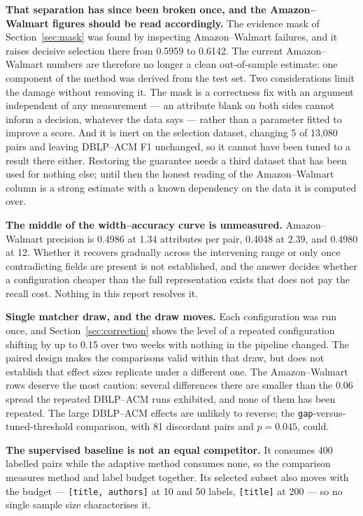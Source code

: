 \documentclass[11pt]{article}
\begin{document}
\textbf{That separation has since been broken once, and the Amazon--Walmart figures should
be read accordingly.} The evidence mask of Section~\ref{sec:mask} was found by inspecting
Amazon--Walmart failures, and it raises decisive selection there from 0.5959 to 0.6142. The
current Amazon--Walmart numbers are therefore no longer a clean out-of-sample estimate:
one component of the method was derived from the test set. Two considerations limit the
damage without removing it. The mask is a correctness fix with an argument independent of
any measurement --- an attribute blank on both sides cannot inform a decision, whatever the
data says --- rather than a parameter fitted to improve a score. And it is inert on the
selection dataset, changing 5 of 13{,}080 pairs and leaving DBLP--ACM F1 unchanged, so it
cannot have been tuned to a result there either. Restoring the guarantee needs a third
dataset that has been used for nothing else; until then the honest reading of the
Amazon--Walmart column is a strong estimate with a known dependency on the data it is
computed over.

\textbf{The middle of the width--accuracy curve is unmeasured.} Amazon--Walmart precision is
0.4986 at 1.34 attributes per pair, 0.4048 at 2.39, and 0.4980 at 12. Whether it recovers
gradually across the intervening range or only once contradicting fields are present is not
established, and the answer decides whether a configuration cheaper than the full
representation exists that does not pay the recall cost. Nothing in this report resolves it.

\textbf{Single matcher draw, and the draw moves.} Each configuration was run once, and
Section~\ref{sec:correction} shows the level of a repeated configuration shifting by up to
0.15 over two weeks with nothing in the pipeline changed. The paired design makes the
comparisons valid within that draw, but does not establish that effect sizes replicate under
a different one. The Amazon--Walmart rows deserve the most caution: several differences there
are smaller than the 0.06 spread the repeated DBLP--ACM runs exhibited, and none of them has
been repeated. The large DBLP--ACM effects are unlikely to reverse; the
\texttt{gap}-versus-tuned-threshold comparison, with 81 discordant pairs and $p = 0.045$,
could.

\textbf{The supervised baseline is not an equal competitor.} It consumes 400 labelled pairs
while the adaptive method consumes none, so the comparison measures method and label budget
together. Its selected subset also moves with the budget --- \texttt{[title, authors]} at 10
and 50 labels, \texttt{[title]} at 200 --- so no single sample size characterises it.
\end{document}
